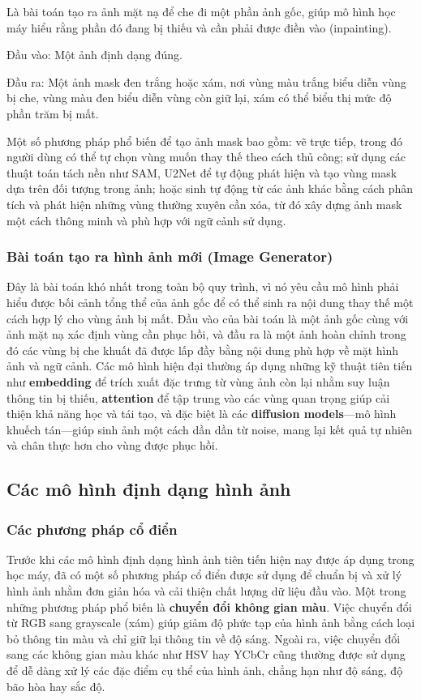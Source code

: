 \documentclass[12pt]{report}
\begin{document}
Là bài toán tạo ra ảnh mặt nạ để che đi một phần ảnh gốc, giúp mô hình học máy hiểu rằng phần đó đang bị thiếu và cần phải được điền vào (inpainting). 

Đầu vào: Một ảnh định dạng đúng.

Đầu ra: Một ảnh mask đen trắng hoặc xám, nơi vùng màu trắng biểu diễn vùng bị che, vùng màu đen biểu diễn vùng còn giữ lại, xám có thể biểu thị mức độ phần trăm bị mất.

Một số phương pháp phổ biến để tạo ảnh mask bao gồm: vẽ trực tiếp, trong đó người dùng có thể tự chọn vùng muốn thay thế theo cách thủ công; sử dụng các thuật toán tách nền như SAM, U2Net để tự động phát hiện và tạo vùng mask dựa trên đối tượng trong ảnh; hoặc sinh tự động từ các ảnh khác bằng cách phân tích và phát hiện những vùng thường xuyên cần xóa, từ đó xây dựng ảnh mask một cách thông minh và phù hợp với ngữ cảnh sử dụng.


\subsubsection{Bài toán tạo ra hình ảnh mới (Image Generator)}

Đây là bài toán khó nhất trong toàn bộ quy trình, vì nó yêu cầu mô hình phải hiểu được bối cảnh tổng thể của ảnh gốc để có thể sinh ra nội dung thay thế một cách hợp lý cho vùng ảnh bị mất. Đầu vào của bài toán là một ảnh gốc cùng với ảnh mặt nạ xác định vùng cần phục hồi, và đầu ra là một ảnh hoàn chỉnh trong đó các vùng bị che khuất đã được lấp đầy bằng nội dung phù hợp về mặt hình ảnh và ngữ cảnh. Các mô hình hiện đại thường áp dụng những kỹ thuật tiên tiến như \textbf{embedding} để trích xuất đặc trưng từ vùng ảnh còn lại nhằm suy luận thông tin bị thiếu, \textbf{attention} để tập trung vào các vùng quan trọng giúp cải thiện khả năng học và tái tạo, và đặc biệt là các \textbf{diffusion models}—mô hình khuếch tán—giúp sinh ảnh một cách dần dần từ noise, mang lại kết quả tự nhiên và chân thực hơn cho vùng được phục hồi.

\subsection{Các mô hình định dạng hình ảnh}

\subsubsection{Các phương pháp cổ điển}

Trước khi các mô hình định dạng hình ảnh tiên tiến hiện nay được áp dụng trong học máy, đã có một số phương pháp cổ điển được sử dụng để chuẩn bị và xử lý hình ảnh nhằm đơn giản hóa và cải thiện chất lượng dữ liệu đầu vào. Một trong những phương pháp phổ biến là \textbf{chuyển đổi không gian màu}. Việc chuyển đổi từ RGB sang grayscale (xám) giúp giảm độ phức tạp của hình ảnh bằng cách loại bỏ thông tin màu và chỉ giữ lại thông tin về độ sáng. Ngoài ra, việc chuyển đổi sang các không gian màu khác như HSV hay YCbCr cũng thường được sử dụng để dễ dàng xử lý các đặc điểm cụ thể của hình ảnh, chẳng hạn như độ sáng, độ bão hòa hay sắc độ.
\end{document}
